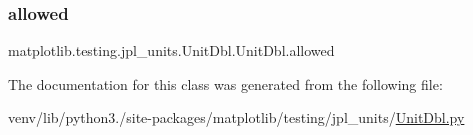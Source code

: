 \subsubsection{\texorpdfstring{allowed}{allowed}}
{\footnotesize\ttfamily matplotlib.\+testing.\+jpl\+\_\+units.\+Unit\+Dbl.\+Unit\+Dbl.\+allowed\hspace{0.3cm}{\ttfamily [static]}}



The documentation for this class was generated from the following file\+:\begin{DoxyCompactItemize}
\item 
venv/lib/python3./site-\/packages/matplotlib/testing/jpl\+\_\+units/\hyperlink{UnitDbl_8py}{Unit\+Dbl.\+py}\end{DoxyCompactItemize}
